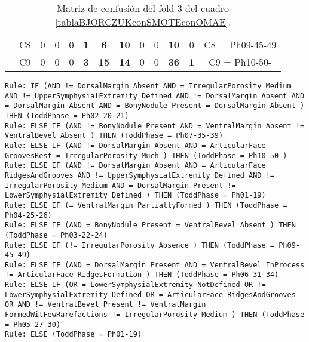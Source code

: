 \begin{table}[H]
{\begin{tabular}{|ccrrrrrrrrrrc|}
\multicolumn{1}{|c|}{}                                      & \multicolumn{1}{c|}{C8} & \multicolumn{1}{c|}{0}          & \multicolumn{1}{c|}{0}  & \multicolumn{1}{c|}{0}          & \multicolumn{1}{c|}{\textbf{1}} & \multicolumn{1}{c|}{\textbf{6}}  & \multicolumn{1}{c|}{\textbf{10}} & \multicolumn{1}{c|}{0}          & \multicolumn{1}{c|}{0}  & \multicolumn{1}{c|}{\textbf{10}} & \multicolumn{1}{c|}{0}          & C8 = Ph09-45-49   \\ \cline{2-13}
\multicolumn{1}{|c|}{}                                      & \multicolumn{1}{c|}{C9} & \multicolumn{1}{c|}{0}          & \multicolumn{1}{c|}{0}  & \multicolumn{1}{c|}{0}          & \multicolumn{1}{c|}{\textbf{3}} & \multicolumn{1}{c|}{\textbf{15}} & \multicolumn{1}{c|}{\textbf{14}} & \multicolumn{1}{c|}{0}          & \multicolumn{1}{c|}{0}  & \multicolumn{1}{c|}{\textbf{36}} & \multicolumn{1}{c|}{\textbf{1}} & C9 = Ph10-50-     \\ \hline
\end{tabular}%
}
\caption{Matriz de confusión del fold 3 del cuadro \ref{tablaBJORCZUKconSMOTEconOMAE}.}
\end{table}

\begin{lstlisting}
Rule: IF (AND != DorsalMargin Absent AND = IrregularPorosity Medium AND != UpperSymphysialExtremity Defined AND != DorsalMargin Absent AND = DorsalMargin Absent AND = BonyNodule Present = DorsalMargin Absent ) THEN (ToddPhase = Ph02-20-21)
Rule: ELSE IF (AND != BonyNodule Present AND = VentralMargin Absent != VentralBevel Absent ) THEN (ToddPhase = Ph07-35-39)
Rule: ELSE IF (AND != DorsalMargin Absent AND = ArticularFace GroovesRest = IrregularPorosity Much ) THEN (ToddPhase = Ph10-50-)
Rule: ELSE IF (AND != DorsalMargin Absent AND = ArticularFace RidgesAndGrooves AND != UpperSymphysialExtremity Defined AND != IrregularPorosity Medium AND = DorsalMargin Present != LowerSymphysialExtremity Defined ) THEN (ToddPhase = Ph01-19)
Rule: ELSE IF (= VentralMargin PartiallyFormed ) THEN (ToddPhase = Ph04-25-26)
Rule: ELSE IF (AND = BonyNodule Present = VentralBevel Absent ) THEN (ToddPhase = Ph03-22-24)
Rule: ELSE IF (!= IrregularPorosity Absence ) THEN (ToddPhase = Ph09-45-49)
Rule: ELSE IF (AND = DorsalMargin Present AND = VentralBevel InProcess != ArticularFace RidgesFormation ) THEN (ToddPhase = Ph06-31-34)
Rule: ELSE IF (OR = LowerSymphysialExtremity NotDefined OR != LowerSymphysialExtremity Defined OR = ArticularFace RidgesAndGrooves OR AND != VentralBevel Present != VentralMargin FormedWitFewRarefactions != IrregularPorosity Medium ) THEN (ToddPhase = Ph05-27-30)
Rule: ELSE (ToddPhase = Ph01-19)
\end{lstlisting}

